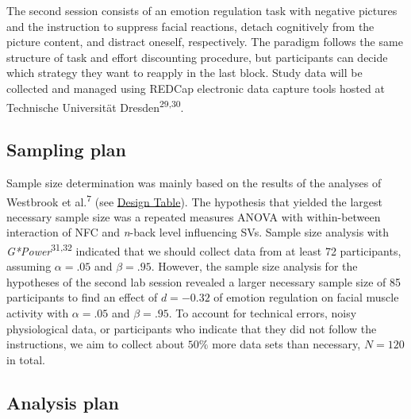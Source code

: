 \documentclass[
  man,floatsintext]{apa6}
\begin{document}
The second session consists of an emotion regulation task with negative pictures and the instruction to suppress facial reactions, detach cognitively from the picture content, and distract oneself, respectively.
The paradigm follows the same structure of task and effort discounting procedure, but participants can decide which strategy they want to reapply in the last block.
Study data will be collected and managed using REDCap electronic data capture tools hosted at Technische Universität Dresden\textsuperscript{29,30}.

\hypertarget{sampling-plan}{%
\subsection{Sampling plan}\label{sampling-plan}}

Sample size determination was mainly based on the results of the analyses of Westbrook et al.\textsuperscript{7} (see \protect\hyperlink{DesignTableSection}{Design Table}).
The hypothesis that yielded the largest necessary sample size was a repeated measures ANOVA with within-between interaction of NFC and \emph{n}-back level influencing SVs.
Sample size analysis with \emph{G*Power}\textsuperscript{31,32} indicated that we should collect data from at least 72 participants, assuming \(\alpha=.05\) and \(\beta=.95\).
However, the sample size analysis for the hypotheses of the second lab session revealed a larger necessary sample size of 85 participants to find an effect of \(d=-0.32\) of emotion regulation on facial muscle activity with \(\alpha=.05\) and \(\beta=.95\).
To account for technical errors, noisy physiological data, or participants who indicate that they did not follow the instructions, we aim to collect about \(50\%\) more data sets than necessary, \(N=120\) in total.

\hypertarget{analysis-plan}{%
\subsection{Analysis plan}\label{analysis-plan}}
\end{document}
